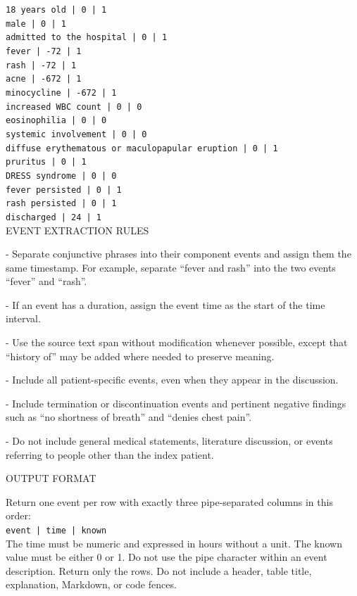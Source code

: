 \begin{tcolorbox}
\texttt{18 years old | 0 | 1} \\
\texttt{male | 0 | 1} \\
\texttt{admitted to the hospital | 0 | 1} \\
\texttt{fever | -72 | 1} \\
\texttt{rash | -72 | 1} \\
\texttt{acne | -672 | 1} \\
\texttt{minocycline | -672 | 1} \\
\texttt{increased WBC count | 0 | 0} \\
\texttt{eosinophilia | 0 | 0} \\
\texttt{systemic involvement | 0 | 0} \\
\texttt{diffuse erythematous or maculopapular eruption | 0 | 1} \\
\texttt{pruritus | 0 | 1} \\
\texttt{DRESS syndrome | 0 | 0} \\
\texttt{fever persisted | 0 | 1} \\
\texttt{rash persisted | 0 | 1} \\
\texttt{discharged | 24 | 1} \\

\vspace{1em}
EVENT EXTRACTION RULES
\vspace{0.2em}

- Separate conjunctive phrases into their component events and assign them the same timestamp. For example, separate ``fever and rash'' into the two events ``fever'' and ``rash''.

- If an event has a duration, assign the event time as the start of the time interval.

- Use the source text span without modification whenever possible, except that ``history of'' may be added where needed to preserve meaning.

- Include all patient-specific events, even when they appear in the discussion.

- Include termination or discontinuation events and pertinent negative findings such as ``no shortness of breath'' and ``denies chest pain''.

- Do not include general medical statements, literature discussion, or events referring to people other than the index patient.

\vspace{1em}
OUTPUT FORMAT
\vspace{.2em}

Return one event per row with exactly three pipe-separated columns in this order:\\
\texttt{event | time | known} \\

The time must be numeric and expressed in hours without a unit. The known value must be either 0 or 1. Do not use the pipe character within an event description. Return only the rows. Do not include a header, table title, explanation, Markdown, or code fences.
\end{tcolorbox}